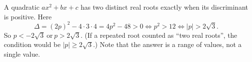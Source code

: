 A quadratic $ax^2+bx+c$ has two distinct real roots exactly when its discriminant is positive. Here
\[
\Delta=(2p)^2-4\cdot3\cdot4=4p^2-48>0\iff p^2>12\iff |p|>2\sqrt3 .
\]
So $\boxed{p<-2\sqrt3\ \text{or}\ p>2\sqrt3}$. (If a repeated root counted as ``two real roots'', the condition would be $|p|\ge2\sqrt3$.) Note that the answer is a range of values, not a single value.
